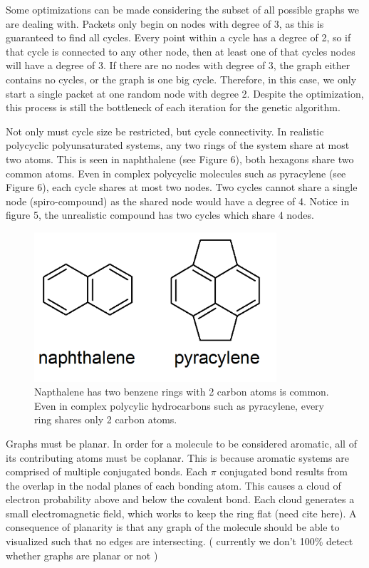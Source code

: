 \documentclass[12pt]{article}
\begin{document}
Some optimizations can be made considering the subset of all possible graphs we are dealing with. Packets only begin on nodes with degree of 3, as this is guaranteed to find all cycles. Every point within a cycle has a degree of 2, so if that cycle is connected to any other node, then at least one of that cycles nodes will have a degree of 3. If there are no nodes with degree of 3, the graph either contains no cycles, or the graph is one big cycle. Therefore, in this case, we only start a single packet at one random node with degree 2. Despite the optimization, this process is still the bottleneck of each iteration for the genetic algorithm.

Not only must cycle size be restricted, but cycle connectivity. In realistic polycyclic polyunsaturated systems, any two rings of the system share at most two atoms. This is seen in naphthalene (see Figure 6), both hexagons share two common atoms. Even in complex polycyclic molecules such as pyracylene (see Figure 6), each cycle shares at most two nodes. Two cycles cannot share a single node (spiro-compound) as the shared node would have a degree of 4. Notice in figure 5, the unrealistic compound has two cycles which share 4 nodes.

\begin{figure}[ht!]
\centering
\includegraphics[width=90mm]{polycyclic.png}
\caption{Napthalene has two benzene rings with 2 carbon atoms is common. Even in complex polycylic hydrocarbons such as pyracylene, every ring shares only 2 carbon atoms.}
\end{figure}

Graphs must be planar. In order for a molecule to be considered aromatic, all of its contributing atoms must be coplanar. This is because aromatic systems are comprised of multiple conjugated bonds. Each $\pi$ conjugated bond results from the overlap in the nodal planes of each bonding atom. This causes a cloud of electron probability above and below the covalent bond. Each cloud generates a small electromagnetic field, which works to keep the ring flat (need cite here). A consequence of planarity is that any graph of the molecule should be able to visualized such that no edges are intersecting. (  currently we don't 100\% detect whether graphs are planar or not ) 
\end{document}
